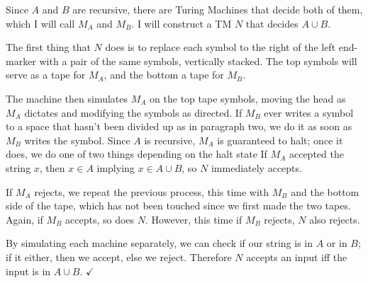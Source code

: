 \documentclass[11pt]{article}
\begin{document}
Since $A$ and $B$ are recursive, there are Turing Machines that decide both of them, which I will call $M_A$ and $M_B$. I will construct a TM $N$ that decides $A \cup B$.

The first thing that $N$ does is to replace each symbol to the right of the left end-marker with a pair of the same symbols, vertically stacked. The top symbols will serve as a tape for $M_A$, and the bottom a tape for $M_B$.

The machine then simulates $M_A$ on the top tape symbols, moving the head as $M_A$ dictates and modifying the symbols as directed. If $M_B$ ever writes a symbol to a space that hasn't been divided up as in paragraph two, we do it as soon as $M_B$ writes the symbol. Since $A$ is recursive, $M_A$ is guaranteed to halt; once it does, we do one of two things depending on the halt state If $M_A$ accepted the string $x$, then $x \in A$ implying $x \in A \cup B$, so $N$ immediately accepts. 

If $M_A$ rejects, we repeat the previous process, this time with $M_B$ and the bottom side of the tape, which has not been touched since we first made the two tapes. Again, if $M_B$ accepts, so does $N$. However, this time if $M_B$ rejects, $N$ also rejects.

By simulating each machine separately, we can check if our string is in $A$ or in $B$; if it either, then we accept, else we reject. Therefore $N$ accepts an input iff the input is in $A \cup B$. $\checkmark$
\end{document}
